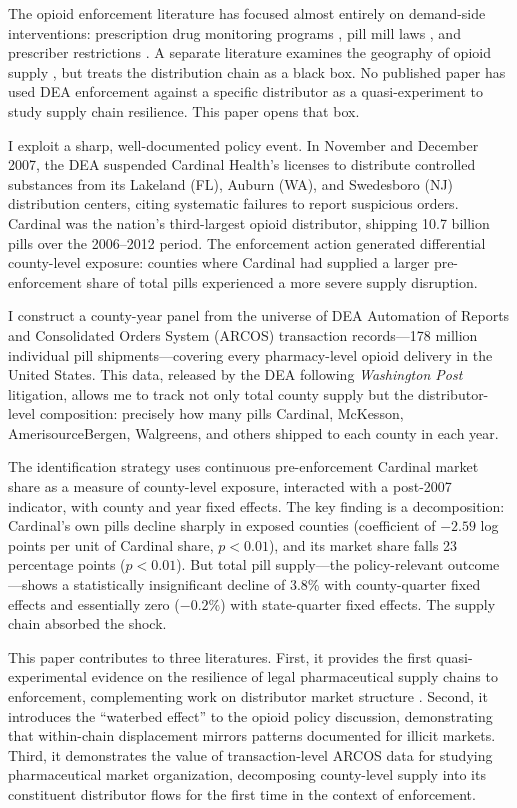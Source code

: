 \documentclass[12pt]{article}
\begin{document}
The opioid enforcement literature has focused almost entirely on demand-side interventions: prescription drug monitoring programs \citep{buchmueller2018effect, kilby2015opioid}, pill mill laws \citep{mallatt2022policy}, and prescriber restrictions \citep{alpert2022origins}. A separate literature examines the geography of opioid supply \citep{ruhm2019drivers, evans2019would}, but treats the distribution chain as a black box. No published paper has used DEA enforcement against a specific distributor as a quasi-experiment to study supply chain resilience. This paper opens that box.

I exploit a sharp, well-documented policy event. In November and December 2007, the DEA suspended Cardinal Health's licenses to distribute controlled substances from its Lakeland (FL), Auburn (WA), and Swedesboro (NJ) distribution centers, citing systematic failures to report suspicious orders. Cardinal was the nation's third-largest opioid distributor, shipping 10.7 billion pills over the 2006--2012 period. The enforcement action generated differential county-level exposure: counties where Cardinal had supplied a larger pre-enforcement share of total pills experienced a more severe supply disruption.

I construct a county-year panel from the universe of DEA Automation of Reports and Consolidated Orders System (ARCOS) transaction records---178 million individual pill shipments---covering every pharmacy-level opioid delivery in the United States. This data, released by the DEA following \textit{Washington Post} litigation, allows me to track not only total county supply but the distributor-level composition: precisely how many pills Cardinal, McKesson, AmerisourceBergen, Walgreens, and others shipped to each county in each year.

The identification strategy uses continuous pre-enforcement Cardinal market share as a measure of county-level exposure, interacted with a post-2007 indicator, with county and year fixed effects. The key finding is a decomposition: Cardinal's own pills decline sharply in exposed counties (coefficient of $-2.59$ log points per unit of Cardinal share, $p < 0.01$), and its market share falls 23 percentage points ($p < 0.01$). But total pill supply---the policy-relevant outcome---shows a statistically insignificant decline of 3.8\% with county-quarter fixed effects and essentially zero ($-0.2\%$) with state-quarter fixed effects. The supply chain absorbed the shock.

This paper contributes to three literatures. First, it provides the first quasi-experimental evidence on the resilience of legal pharmaceutical supply chains to enforcement, complementing work on distributor market structure \citep{arcos_competitive}. Second, it introduces the ``waterbed effect'' to the opioid policy discussion, demonstrating that within-chain displacement mirrors patterns documented for illicit markets. Third, it demonstrates the value of transaction-level ARCOS data for studying pharmaceutical market organization, decomposing county-level supply into its constituent distributor flows for the first time in the context of enforcement.
\end{document}
